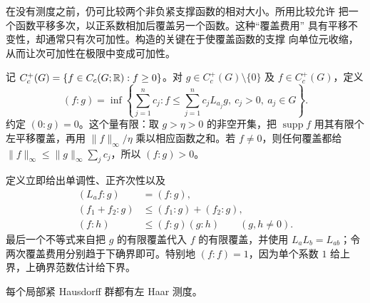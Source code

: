在没有测度之前，仍可比较两个非负紧支撑函数的相对大小。所用比较允许
把一个函数平移多次，以正系数相加后覆盖另一个函数。这种“覆盖费用”
具有平移不变性，却通常只有次可加性。构造的关键在于使覆盖函数的支撑
向单位元收缩，从而让次可加性在极限中变成可加性。

记 $C_c^+(G)=\{f\in C_c(G;\mathbb{R}):f\ge0\}$。对 $g\in C_c^+(G)\setminus\{0\}$
及 $f\in C_c^+(G)$，定义
\[
 (f:g)=\inf\left\{\sum_{j=1}^n c_j:
 f\le\sum_{j=1}^n c_jL_{a_j}g,\ c_j>0,\ a_j\in G\right\}.
\]
约定 $(0:g)=0$。这个量有限：取 $g>\eta>0$ 的非空开集，把
$\operatorname{supp}f$ 用其有限个左平移覆盖，再用
$\|f\|_\infty/\eta$ 乘以相应函数之和。若 $f\ne0$，则任何覆盖都给
$\|f\|_\infty\le\|g\|_\infty\sum_jc_j$，所以 $(f:g)>0$。

定义立即给出单调性、正齐次性以及
\begin{align*}
 (L_af:g)&=(f:g),\\
 (f_1+f_2:g)&\le(f_1:g)+(f_2:g),\\
 (f:h)&\le(f:g)(g:h)\qquad(g,h\ne0).
\end{align*}
最后一个不等式来自把 $g$ 的有限覆盖代入 $f$ 的有限覆盖，并使用
$L_aL_b=L_{ab}$；令两次覆盖费用分别趋于下确界即可。特别地
$(f:f)=1$，因为单个系数 $1$ 给上界，上确界范数估计给下界。

\begin{theorem}
\label{thm:haar-existence}
每个局部紧 Hausdorff 群都有左 Haar 测度。
\end{theorem}

